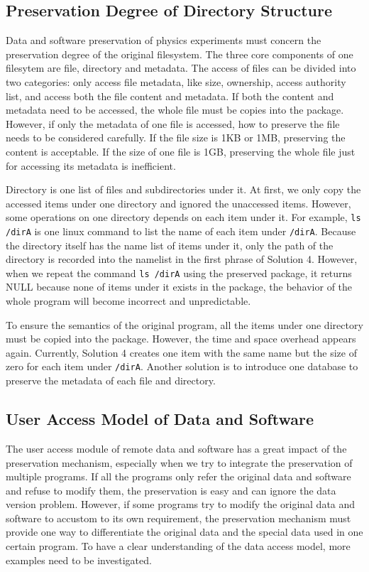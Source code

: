 \documentclass{sig-alternate}
\begin{document}
\subsection{Preservation Degree of Directory Structure}

Data and software preservation of physics experiments must concern the
preservation degree of the original filesystem.  The three core components of
one filesytem are file, directory and metadata.  The access of files can be
divided into two categories: only access file metadata, like size, ownership,
access authority list, and access both the file content and metadata.  If both
the content and metadata need to be accessed, the whole file must be copies
into the package.  However, if only the metadata of one file is accessed, how
to preserve the file needs to be considered carefully. If the file size
is 1KB or 1MB, preserving the content is acceptable. If the size of one file is
1GB, preserving the whole file just for accessing its metadata is
inefficient.  

Directory is one list of files and subdirectories under it. At first, we only
copy the accessed items under one directory and ignored the unaccessed items.
However, some operations on one directory depends on each item under it. For
example, {\tt ls /dirA} is one linux command to list the name of each item under
{\tt /dirA}. Because the directory itself has the name list of items under it, only
the path of the directory is recorded into the namelist in the first phrase of
Solution 4. However, when we repeat the command {\tt ls /dirA} using the preserved package, it returns NULL because none of items under it exists in
the package, the behavior of the whole program will become incorrect
and unpredictable. 

To ensure the semantics of the original program, all the items under one directory must be copied
into the package. However, the
time and space overhead appears again. Currently, Solution 4 creates one item
with the same name but the size of zero for each item under {\tt /dirA}. Another
solution is to introduce one database to preserve the metadata of each file and
directory. 

\subsection{User Access Model of Data and Software}

The user access module of remote data
and software has a great impact of the preservation mechanism, especially when
we try to integrate the preservation of multiple programs. If all the programs
only refer the original data and software and refuse to modify them, the
preservation is easy and can ignore the data version problem. However, if some
programs try to modify the original data and software to accustom to its own
requirement, the preservation mechanism must provide one way to differentiate
the original data and the special data used in one certain
program. To have a clear understanding of the data access model, more examples
need to be investigated.
\end{document}

